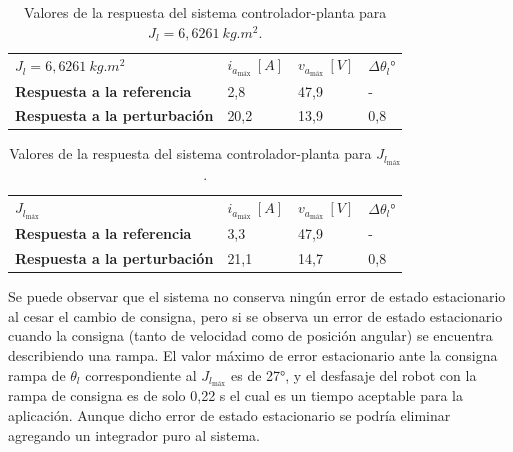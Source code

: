 \documentclass{article}
\begin{document}
\begin{sloppypar}
\begin{table}[H]
    \centering
    \begin{tabular}{|l|l|l|l|}
    \cline{1-4}
    \textbf{$J_l=6,6261 ~kg.m^2$}        & $i_{a_{\text{máx}}} ~[A]$ & $v_{a_{\text{máx}}} ~[V]$ & $\Delta\theta_l$° \\\cline{1-4}
    \textbf{Respuesta a la referencia}   & 2,8                       & 47,9                      & -                 \\\cline{1-4}
    \textbf{Respuesta a la perturbación} & 20,2                      & 13,9                      & 0,8               \\\cline{1-4}
    \end{tabular}
    \caption{\label{table:Valores de la respuesta del sistema controlador-planta para Jl=6,6261}Valores de la respuesta del sistema controlador-planta para $J_l=6,6261 ~kg.m^2$.}
\end{table}

\begin{table}[H]
    \centering
    \begin{tabular}{|l|l|l|l|}
    \cline{1-4}
    \textbf{$J_{l_{\text{máx}}}$}        & $i_{a_{\text{máx}}} ~[A]$ & $v_{a_{\text{máx}}} ~[V]$ & $\Delta\theta_l$° \\\cline{1-4}
    \textbf{Respuesta a la referencia}   & 3,3                       & 47,9                      & -                 \\\cline{1-4}
    \textbf{Respuesta a la perturbación} & 21,1                      & 14,7                      & 0,8               \\\cline{1-4}
    \end{tabular}
    \caption{\label{table:Valores de la respuesta del sistema controlador-planta para Jlmáx}Valores de la respuesta del sistema controlador-planta para $J_{l_{\text{máx}}}$.}
\end{table}


Se puede observar que el sistema no conserva ningún error de estado estacionario al cesar el cambio de consigna, pero si se observa un error de estado estacionario cuando la consigna (tanto de velocidad como de posición angular) se encuentra describiendo una rampa. El valor máximo de error estacionario ante la  consigna rampa de $\theta_l$ correspondiente al $J_{l_{\text{máx}}}$ es de 27°, y el desfasaje del robot con la rampa de consigna es de solo 0,22 s el cual es un tiempo aceptable para la aplicación. Aunque dicho error de estado estacionario se podría eliminar agregando un integrador puro al sistema.















\end{sloppypar}
\end{document}
